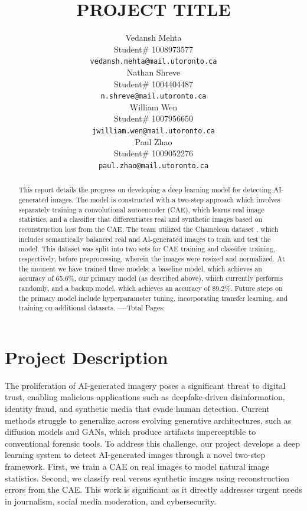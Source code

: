 \documentclass{article} %
\title{PROJECT TITLE}
\author{Vedansh Mehta  \\
Student\# 1008973577 \\
\texttt{vedansh.mehta@mail.utoronto.ca} \\
\And
Nathan Shreve  \\
Student\# 1004404487 \\
\texttt{n.shreve@mail.utoronto.ca} \\
\AND
William Wen  \\
Student\# 1007956650 \\
\texttt{jwilliam.wen@mail.utoronto.ca} \\
\And
Paul Zhao \\
Student\# 1009052276 \\
\texttt{paul.zhao@mail.utoronto.ca} \\
\AND
}
\begin{document}
\maketitle

\begin{abstract}
    This report details the progress on developing a deep learning model for detecting AI-generated images. The model is constructed with a two-step approach which involves separately training a convolutional autoencoder (CAE), which learns real image statistics, and a classifier that differentiates real and synthetic images based on reconstruction loss from the CAE. The team utilized the Chameleon dataset \citep{yan2024sanity}, which includes semantically balanced real and AI-generated images to train and test the model. This dataset was split into two sets for CAE training and classifier training, respectively, before preprocessing, wherein the images were resized and normalized. At the moment we have trained three models: a baseline model, which achieves an accuracy of 65.6\%, our primary model (as described above), which currently performs randomly, and a backup model, which achieves an accuracy of 89.2\%. Future steps on the primary model include hyperparameter tuning, incorporating transfer learning, and training on additional datasets.
    ----Total Pages: \pageref{last_page}
\end{abstract}



\section{Project Description}

The proliferation of AI-generated imagery poses a significant threat to digital trust, enabling malicious applications such as deepfake-driven disinformation, identity fraud, and synthetic media that evade human detection. Current methods struggle to generalize across evolving generative architectures, such as diffusion models and GANs, which produce artifacts imperceptible to conventional forensic tools. To address this challenge, our project develops a deep learning system to detect AI-generated images through a novel two-step framework. First, we train a CAE on real images to model natural image statistics. Second, we classify real versus synthetic images using reconstruction errors from the CAE. This work is significant as it directly addresses urgent needs in journalism, social media moderation, and cybersecurity.
\end{document}
